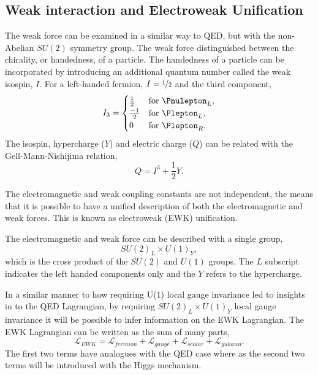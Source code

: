 \subsection{Weak interaction and Electroweak Unification}
\label{sec:EWK}

The weak force can be examined in a similar way to QED, but with the non-Abelian
$SU(2)$ symmetry group. The weak force distinguished between the chirality, or
handedness, of a particle.
The handedness of a particle can be incorporated by introducing an additional
quantum number called the weak isospin, $I$.
For a left-handed fermion, $I=\nicefrac{1}{2}$ and the third component,
\begin{equation}
I_{3} =
  \begin{cases}
    \frac{1}{2}  & \text{for \Pnulepton}_L,  \\
    \frac{-1}{2} & \text{for \Plepton}_L, \\
    0            & \text{for \Plepton}_R.
  \end{cases}
\end{equation}
The isospin, hypercharge ($Y$) and electric charge ($Q$) can be related with the
Gell-Mann-Nishijima relation,
\begin{equation}
Q = I^{3} + \frac{1}{2}Y.
\end{equation}

The electromagnetic and weak coupling constants are not independent, the means that it is
possible to have a unified description of both the electromagnetic and weak
forces. This is known as electroweak (EWK) unification.

The electromagnetic and weak force can be described with a single group,
\begin{equation}
SU(2)_{L} \times U(1)_{Y},
\end{equation}
which is the cross product of the $SU(2)$ and $U(1)$ groups. The $L$ subscript
indicates the left handed components only and the $Y$ refers to the hypercharge.

In a similar manner to how requiring U(1) local gauge invariance led to insights
in to the QED Lagrangian, by requiring $SU(2)_{L} \times U(1)_{Y}$ local gauge
invariance it will be possible to infer information on the EWK Lagrangian.
The EWK Lagrangian can be written as the sum of many parts,
\begin{equation}
\mathcal{L}_{EWK} = 
\mathcal{L}_{fermion}
+ \mathcal{L}_{gauge}
+ \mathcal{L}_{scalar}
+ \mathcal{L}_{yukawa}.
\end{equation}
The first two terms have analogues with the QED case where as the second two
terms will be introduced with the Higgs mechanism.

